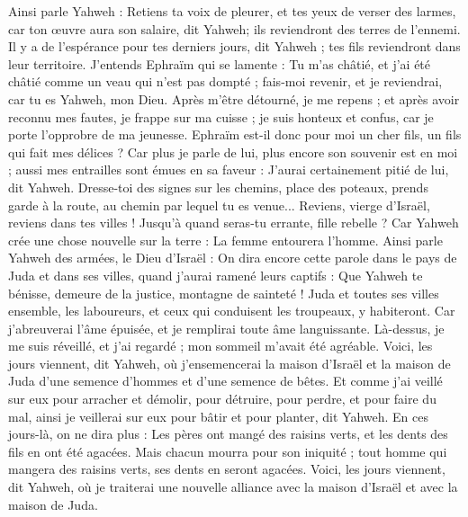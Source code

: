 \begin{multicols}{2}
Ainsi parle Yahweh : Retiens ta voix de pleurer, et tes yeux de verser des larmes, car ton œuvre aura son salaire, dit Yahweh; ils reviendront des terres de l'ennemi.
Il y a de l'espérance pour tes derniers jours, dit Yahweh ; tes fils reviendront dans leur territoire.
J'entends Ephraïm qui se lamente : Tu m'as châtié, et j'ai été châtié comme un veau qui n’est pas dompté ; fais-moi revenir, et je reviendrai, car tu es Yahweh, mon Dieu.
Après m’être détourné, je me repens ; et après avoir reconnu mes fautes, je frappe sur ma cuisse ; je suis honteux et confus, car je porte l'opprobre de ma jeunesse.
Ephraïm est-il donc pour moi un cher fils, un fils qui fait mes délices ? Car plus je parle de lui, plus encore son souvenir est en moi ; aussi mes entrailles sont émues en sa faveur : J'aurai certainement pitié de lui, dit Yahweh.
Dresse-toi des signes sur les chemins, place des poteaux, prends garde à la route, au chemin par lequel tu es venue... Reviens, vierge d'Israël, reviens dans tes villes !
Jusqu’à quand seras-tu errante, fille rebelle ? Car Yahweh crée une chose nouvelle sur la terre : La femme entourera l'homme.
Ainsi parle Yahweh des armées, le Dieu d'Israël : On dira encore cette parole dans le pays de Juda et dans ses villes, quand j'aurai ramené leurs captifs : Que Yahweh te bénisse, demeure de la justice, montagne de sainteté !
Juda et toutes ses villes ensemble, les laboureurs, et ceux qui conduisent les troupeaux, y habiteront.
Car j'abreuverai l'âme épuisée, et je remplirai toute âme languissante.
Là-dessus, je me suis réveillé, et j'ai regardé ; mon sommeil m’avait été agréable.
Voici, les jours viennent, dit Yahweh, où j’ensemencerai la maison d'Israël et la maison de Juda d’une semence d'hommes et d’une semence de bêtes.
Et comme j'ai veillé sur eux pour arracher et démolir, pour détruire, pour perdre, et pour faire du mal, ainsi je veillerai sur eux pour bâtir et pour planter, dit Yahweh.
En ces jours-là, on ne dira plus : Les pères ont mangé des raisins verts, et les dents des fils en ont été agacées.
Mais chacun mourra pour son iniquité ; tout homme qui mangera des raisins verts, ses dents en seront agacées.
Voici, les jours viennent, dit Yahweh, où je traiterai une nouvelle alliance avec la maison d'Israël et avec la maison de Juda.

\end{multicols}

